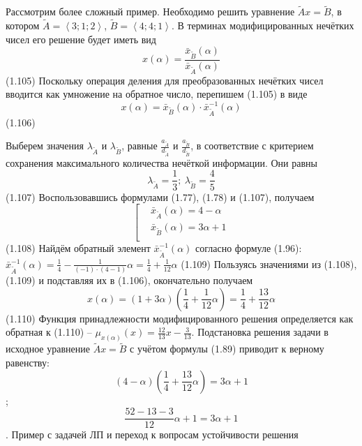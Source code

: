 Рассмотрим более сложный пример. Необходимо решить уравнение $\tilde{A}x=\tilde{B}$, в котором $\tilde{A}=\left\langle 3;1;2 \right\rangle $, $\tilde{B}=\left\langle 4;4;1 \right\rangle $. В терминах модифицированных нечётких чисел его решение будет иметь вид
	\[x\left( \alpha  \right)=\frac{{{{\bar{x}}}_{{\tilde{B}}}}\left( \alpha  \right)}{{{{\bar{x}}}_{{\tilde{A}}}}\left( \alpha  \right)}\] 	(1.105)
Поскольку операция деления для преобразованных нечётких чисел вводится как умножение на обратное число, перепишем (1.105) в виде
	\[x\left( \alpha  \right)=\bar x_{\tilde B}\left( \alpha  \right)\cdot \bar{x}_{{\tilde{A}}}^{-1}\left( \alpha  \right)\] 	(1.106)

Выберем значения $\lambda_{\tilde A}$ и $\lambda_{\tilde B}$, равные $\frac{a_{\tilde A}}{d_{\tilde A}}$ и $\frac{a_{\tilde B}}{d_{\tilde B}}$, в соответствие с критерием сохранения максимального количества нечёткой информации. Они равны
	\[{{\lambda }_{{\tilde{A}}}}=\frac{1}{3};\ {{\lambda }_{{\tilde{B}}}}=\frac{4}{5}\] 	(1.107)
Воспользовавшись формулами (1.77), (1.78) и (1.107), получаем
	\[\left[ \begin{aligned}
  & {{{\bar{x}}}_{{\tilde{A}}}}\left( \alpha  \right)=4-\alpha  \\ 
 & {{{\bar{x}}}_{{\tilde{B}}}}\left( \alpha  \right)=3\alpha +1 \\ 
\end{aligned} \right.\] 	(1.108)
Найдём обратный элемент $\bar{x}_{{\tilde{A}}}^{-1}\left( \alpha  \right)$ согласно формуле (1.96): 
	$\bar{x}_{{\tilde{A}}}^{-1}\left( \alpha  \right)=\frac{1}{4}-\frac{1}{\left( -1 \right)\cdot \left( 4-1 \right)}\alpha =\frac{1}{4}+\frac{1}{12}\alpha $ 	(1.109)
Пользуясь значениями из (1.108), (1.109) и подставляя их в (1.106), окончательно получаем
	\[x\left( \alpha  \right)=\left( 1+3\alpha  \right)\left( \frac{1}{4}+\frac{1}{12}\alpha  \right)=\frac{1}{4}+\frac{13}{12}\alpha \] 	(1.110)
Функция принадлежности модифицированного решения определяется как обратная к (1.110) – ${{\mu }_{x(\alpha )}}\left( x \right)=\frac{12}{13}x-\frac{3}{13}$. Подстановка решения задачи в исходное уравнение $\tilde{A}x=\tilde{B}$ с учётом формулы (1.89) приводит к верному равенству:
	\[\left( 4-\alpha  \right)\left( \frac{1}{4}+\frac{13}{12}\alpha  \right)=3\alpha +1\];
	\[\frac{52-13-3}{12}\alpha +1=3\alpha +1\].
Пример с задачей ЛП и переход к вопросам устойчивости решения
